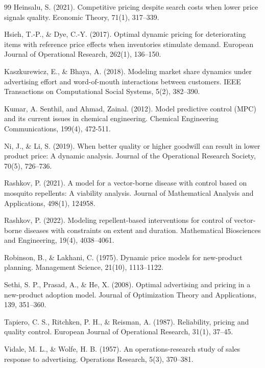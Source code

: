 \documentclass[]{interact}
\theoremstyle{plain}%
\theoremstyle{definition}
\theoremstyle{remark}
\begin{document}
\begin{thebibliography}{99}
Heinsalu, S. (2021). Competitive pricing despite search costs when lower price signals quality. Economic Theory, 71(1), 317--339.

Hsieh, T.-P., \& Dye, C.-Y. (2017). Optimal dynamic pricing for deteriorating items with reference price effects when inventories stimulate demand. European Journal of Operational Research, 262(1), 136--150.

Kaszkurewicz, E., \& Bhaya, A. (2018). Modeling market share dynamics under advertising effort and word-of-mouth interactions between customers. IEEE Transactions on Computational Social Systems, 5(2), 382--390.

Kumar, A. Senthil, and Ahmad, Zainal. (2012). Model predictive control (MPC) and its current issues in chemical engineering. Chemical Engineering Communications, 199(4), 472-511.

Ni, J., \& Li, S. (2019). When better quality or higher goodwill can result in lower product price: A dynamic analysis. Journal of the Operational Research Society, 70(5), 726--736.

Rashkov, P. (2021). A model for a vector-borne disease with control based on mosquito repellents: A viability analysis. Journal of Mathematical Analysis and Applications, 498(1), 124958.

Rashkov, P. (2022). Modeling repellent-based interventions for control of vector-borne diseases with constraints on extent and duration. Mathematical Biosciences and Engineering, 19(4), 4038--4061.



Robinson, B., \& Lakhani, C. (1975). Dynamic price models for new-product planning. Management Science, 21(10), 1113--1122.

Sethi, S. P., Prasad, A., \& He, X. (2008). Optimal advertising and pricing in a new-product adoption model. Journal of Optimization Theory and Applications, 139, 351--360.

Tapiero, C. S., Ritchken, P. H., \& Reisman, A. (1987). Reliability, pricing and quality control. European Journal of Operational Research, 31(1), 37--45.



Vidale, M. L., \& Wolfe, H. B. (1957). An operations-research study of sales response to advertising. Operations Research, 5(3), 370--381.


\end{thebibliography}
\end{document}
